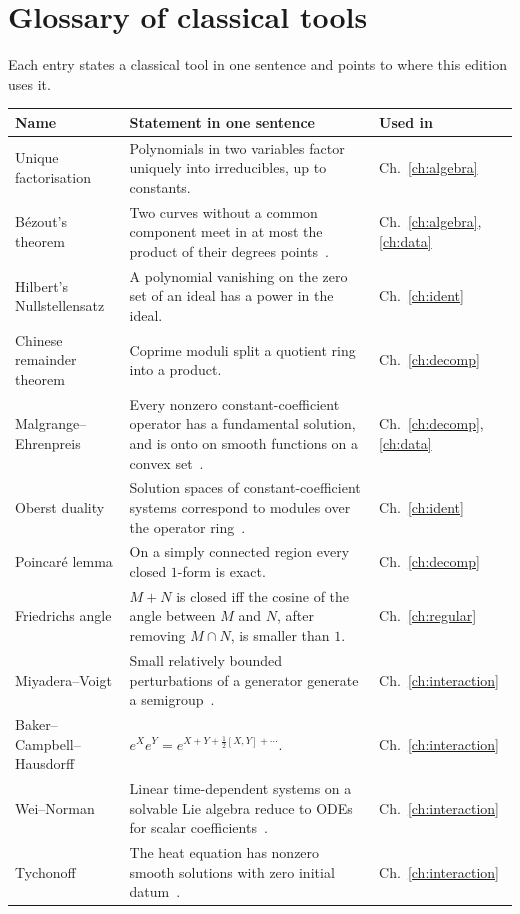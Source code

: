 \chapter{Glossary of classical tools}\label{app:gloss}

Each entry states a classical tool in one sentence and points to where this edition uses it.

\begin{center}\small
\begin{longtable}{@{}L{3.5cm}L{8.6cm}L{2.2cm}@{}}
\toprule
Name & Statement in one sentence & Used in\\\midrule\endhead
Unique factorisation & Polynomials in two variables factor uniquely into irreducibles, up to constants. & Ch.~\ref{ch:algebra}\\
B\'ezout's theorem & Two curves without a common component meet in at most the product of their degrees points~\cite{fu}. & Ch.~\ref{ch:algebra}, \ref{ch:data}\\
Hilbert's Nullstellensatz & A polynomial vanishing on the zero set of an ideal has a power in the ideal. & Ch.~\ref{ch:ident}\\
Chinese remainder theorem & Coprime moduli split a quotient ring into a product. & Ch.~\ref{ch:decomp}\\
Malgrange--Ehrenpreis & Every nonzero constant-coefficient operator has a fundamental solution, and is onto on smooth functions on a convex set~\cite{eh,ma}. & Ch.~\ref{ch:decomp}, \ref{ch:data}\\
Oberst duality & Solution spaces of constant-coefficient systems correspond to modules over the operator ring~\cite{ob}. & Ch.~\ref{ch:ident}\\
Poincar\'e lemma & On a simply connected region every closed $1$-form is exact. & Ch.~\ref{ch:decomp}\\
Friedrichs angle & $M+N$ is closed iff the cosine of the angle between $M$ and $N$, after removing $M\cap N$, is smaller than $1$. & Ch.~\ref{ch:regular}\\
Miyadera--Voigt & Small relatively bounded perturbations of a generator generate a semigroup~\cite{en}. & Ch.~\ref{ch:interaction}\\
Baker--Campbell--Hausdorff & $e^Xe^Y=e^{X+Y+\frac12[X,Y]+\cdots}$. & Ch.~\ref{ch:interaction}\\
Wei--Norman & Linear time-dependent systems on a solvable Lie algebra reduce to ODEs for scalar coefficients~\cite{wn}. & Ch.~\ref{ch:interaction}\\
Tychonoff & The heat equation has nonzero smooth solutions with zero initial datum~\cite{fj}. & Ch.~\ref{ch:interaction}\\

\end{longtable}
\end{center}
